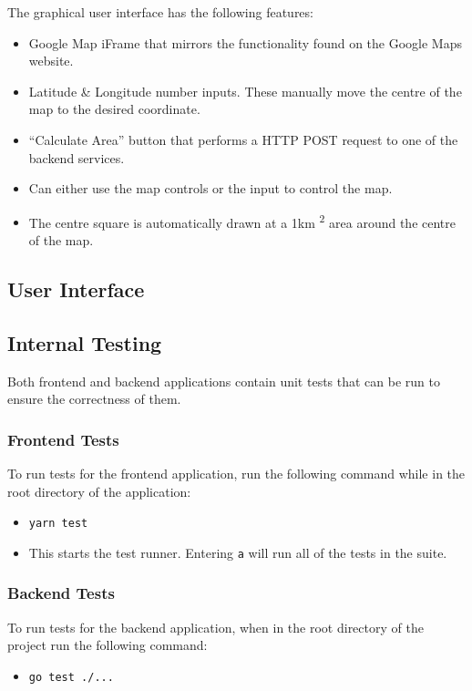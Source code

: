 \documentclass[a4paper,11pt]{article}
\def\code#1{\texttt{#1}}
\begin{document}
The graphical user interface has the following features:

\begin{itemize}
  \item Google Map iFrame that mirrors the functionality found on the Google
    Maps website.
  \item Latitude \& Longitude number inputs. These manually move the centre of the map
    to the desired coordinate.
  \item ``Calculate Area'' button that performs a HTTP POST request to one of the
    backend services.
  \item Can either use the map controls or the input to control the map.
  \item The centre square is automatically drawn at a 1km \textsuperscript{2}
    area around the centre of  the map.
\end{itemize}

\subsection{User Interface}


\subsection{Internal Testing}

Both frontend and backend applications contain unit tests that can be run to
ensure the correctness of them.

\subsubsection{Frontend Tests}

To run tests for the frontend application, run the following command while in
the root directory of the application:

\begin{itemize}
  \item \code{yarn test}
  \item This starts the test runner. Entering \code{a} will run all of the tests
    in the suite.
\end{itemize}

\subsubsection{Backend Tests}

To run tests for the backend application, when in the root directory of the
project run the following command:

\begin{itemize}
  \item \code{go test ./...}
\end{itemize}
\end{document}
